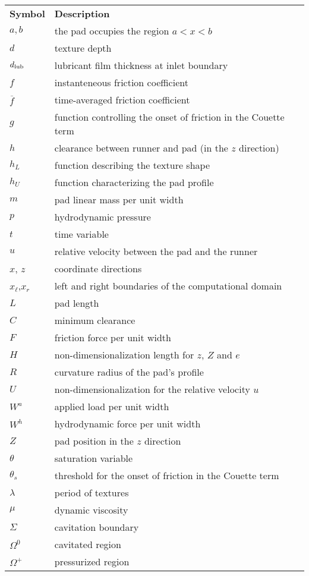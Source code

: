  

\begin{longtable}[l]{p{50pt} p{400pt} }
\textbf{Symbol} &  \textbf{Description}  \\
$a,b$ & the pad occupies the region $a < x < b$ \\
$d$ & texture depth \\
$d_{\mbox{\scriptsize lub}}$ & lubricant film thickness at inlet boundary \\
$f$ & instanteneous friction coefficient \\
$\overline{f}$ & time-averaged friction coefficient \\
$g$ & function controlling the onset of friction in the Couette term \\
$h$ & clearance between runner and pad (in the $z$ direction) \\
$h_L$ & function describing the texture shape \\
$h_U$ & function characterizing the pad profile  \\
$m$ & pad linear mass per unit width\\
$p$ & hydrodynamic pressure \\
$t$ & time variable\\
$u$ & relative velocity between the pad and the runner \\
$x$, $z$ & coordinate directions  \\
$x_{\ell}$,$x_{r}$ & left and right boundaries of the computational domain  \\
$L$ & pad length\\
$C$ & minimum clearance \\
$F$ & friction force per unit width\\
$H$ & non-dimensionalization length for $z$, $Z$ and $e$ \\
$R$ & curvature radius of the pad's profile \\
$U$ & non-dimensionalization for the relative velocity $u$ \\
$W^{a}$ & applied load per unit width\\
$W^{h}$ & hydrodynamic force per unit width\\
$Z$ & pad position in the $z$ direction \\
$\theta$ & saturation variable \\
$\theta_s$ & threshold for the onset of friction in the Couette term \\
$\lambda$ & period of textures  \\
$\mu$ & dynamic viscosity \\
$\Sigma$ & cavitation boundary \\
$\Omega^0$ & cavitated region \\
$\Omega^+$ & pressurized region \\
\end{longtable}

